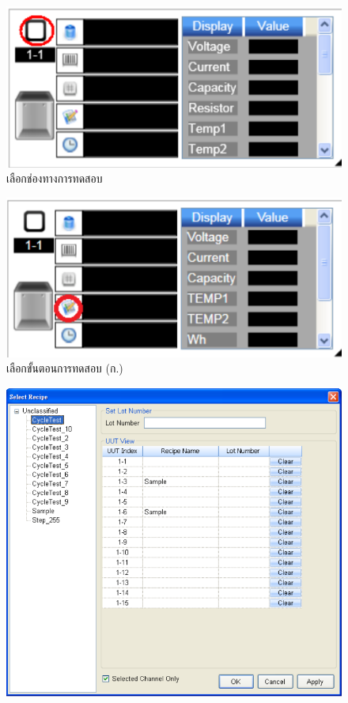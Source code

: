 \begin{center}
	\begin{figure}[H]
		\centering
		\includegraphics[width=1\linewidth]{Chapters/img/17020_Program/Recipe_Executor/battery_select_box.png}
		\centering
		\captionsetup{justification=centering,margin=2cm}
		\caption{เลือกช่องทางการทดสอบ}
		\label{fig:select_box}
	\end{figure}
	\begin{figure}[H]
		\includegraphics[width=1\linewidth]{Chapters/img/17020_Program/Recipe_Executor/battery_data_display.png}
		\centering
		\captionsetup{justification=centering,margin=2cm}
		\caption{เลือกขั้นตอนการทดสอบ (ก.)}
		\label{fig:data_display_recipe_executor}
	\end{figure}
	\begin{figure}[H]
		\includegraphics[width=1\linewidth]{Chapters/img/17020_Program/Recipe_Executor/recipe_setup_win.png}

\end{figure}
\end{center}
